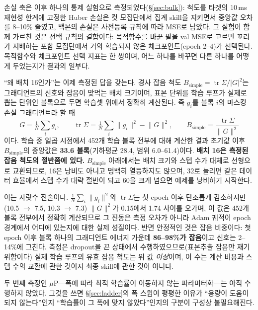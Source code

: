 \documentclass[10pt,a4paper]{article}
\begin{document}
손실 축은 이후 하나의 통제 실험으로 측정되었다(\S\ref{sec:bulk}): 척도를 타겟의
10\,ms 재현성 한계에 고정한 Huber 손실은 컷 모집단에서 집계 skill을 지키면서
중앙값 오차를 8--10\% 줄였고, 백본의 손실은 사전등록 규칙에 따라 MSE로 남았다.
그 실험이 함께 가르친 것은 선택 규칙의 결합이다: 목적함수를 바꾼 팔을 val MSE로
고르면 꼬리가 지배하는 포함 모집단에서 거의 학습되지 않은 체크포인트(epoch
2--4)가 선택된다. 목적함수와 체크포인트 선택 지표는 한 쌍이며, 어느 하나를 바꾸면
다른 하나를 어떻게 두었는지가 결과의 일부다.

``왜 배치 16인가''는 이제 측정된 답을 갖는다. 경사 잡음 척도
$B_\mathrm{simple} = \operatorname{tr}\Sigma / |G|^2$는 그래디언트의 신호와 잡음이
맞먹는 배치 크기이며, 표본 단위를 학습 루프가 실제로 뽑는 단위인 블록으로 두면
학습셋 위에서 정확히 계산된다. 즉 $g_i$를 블록 $i$의 마스킹 손실 그래디언트라 할 때
%
\begin{equation}
  G = \tfrac{1}{N}\sum_i g_i,\qquad
  \operatorname{tr}\Sigma = \tfrac{1}{N}\sum_i \lVert g_i\rVert^2 - \lVert G\rVert^2,\qquad
  B_\mathrm{simple} = \frac{\operatorname{tr}\Sigma}{\lVert G\rVert^2}
  \label{eq:bsimple}
\end{equation}
%
이다. 학습 중 일곱 시점에서 452개 학습 블록 전부에 대해 계산한 결과 초기값 이후
$B_\mathrm{simple}$의 중앙값은 \textbf{33.6 블록}(기하평균 28.4, 범위 6.0--61.4)이다.
\textbf{배치 16은 측정된 잡음 척도의 절반쯤에 있다.} $B_\mathrm{simple}$ 아래에서는
배치 크기와 스텝 수가 대체로 선형으로 교환되므로, 16은 낭비도 아니고 명백히
열등하지도 않으며, 32로 늘리면 같은 데이터 효율에서 스텝 수가 대략 절반이 되고
60을 크게 넘으면 예제를 낭비하기 시작한다.

이는 자릿수 진술이다. $\frac{1}{N}\sum_i\lVert g_i\rVert^2$와
$\operatorname{tr}\Sigma$는 첫 epoch 이후 단조롭게 감소하지만(10.5 $\rightarrow$ 7.5,
10.3 $\rightarrow$ 7.3) $\lVert G\rVert^2$가 0.15에서 1.74 사이를 오가며, 이 값은
452개 블록 전부에서 정확히 계산되므로 그 진동은 측정 오차가 아니라 Adam 궤적이 epoch
경계에서 어디에 있는지에 대한 실제 성질이다. 반면 안정적인 것은 잡음 비중이다:
첫 epoch 이후 블록 하나의 그래디언트 에너지 가운데 \textbf{86--98\%가 잡음}이고
신호는 2--14\%에 그친다. 측정은 dropout을 끈 상태에서 수행하였으므로(표본추출 잡음만
재기 위함이다) 실제 학습 루프의 유효 잡음 척도는 위 값 \emph{이상}이며, 이 수는 계산
비용과 스텝 수의 교환에 관한 것이지 최종 skill에 관한 것이 아니다.

두 번째 측정인 $\mu$P---폭에 따라 최적 학습률이 이동하지 않는 파라미터화---는 아직
수행하지 않았다. 그것을 쓰면 \S\ref{sec:ladder}의 폭 스윕이 평평한 이유가 ``용량이
도움이 되지 않는다''인지 ``학습률이 그 폭에 맞지 않았다''인지의 구분이 구성상
불필요해진다.
\end{document}
